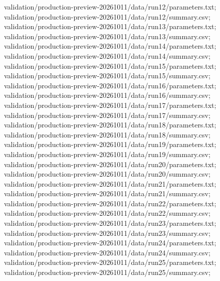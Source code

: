 validation/\allowbreak{}production-preview-20261011/\allowbreak{}data/\allowbreak{}run12/\allowbreak{}parameters.txt; validation/\allowbreak{}production-preview-20261011/\allowbreak{}data/\allowbreak{}run12/\allowbreak{}summary.csv; validation/\allowbreak{}production-preview-20261011/\allowbreak{}data/\allowbreak{}run13/\allowbreak{}parameters.txt; validation/\allowbreak{}production-preview-20261011/\allowbreak{}data/\allowbreak{}run13/\allowbreak{}summary.csv; validation/\allowbreak{}production-preview-20261011/\allowbreak{}data/\allowbreak{}run14/\allowbreak{}parameters.txt; validation/\allowbreak{}production-preview-20261011/\allowbreak{}data/\allowbreak{}run14/\allowbreak{}summary.csv; validation/\allowbreak{}production-preview-20261011/\allowbreak{}data/\allowbreak{}run15/\allowbreak{}parameters.txt; validation/\allowbreak{}production-preview-20261011/\allowbreak{}data/\allowbreak{}run15/\allowbreak{}summary.csv; validation/\allowbreak{}production-preview-20261011/\allowbreak{}data/\allowbreak{}run16/\allowbreak{}parameters.txt; validation/\allowbreak{}production-preview-20261011/\allowbreak{}data/\allowbreak{}run16/\allowbreak{}summary.csv; validation/\allowbreak{}production-preview-20261011/\allowbreak{}data/\allowbreak{}run17/\allowbreak{}parameters.txt; validation/\allowbreak{}production-preview-20261011/\allowbreak{}data/\allowbreak{}run17/\allowbreak{}summary.csv; validation/\allowbreak{}production-preview-20261011/\allowbreak{}data/\allowbreak{}run18/\allowbreak{}parameters.txt; validation/\allowbreak{}production-preview-20261011/\allowbreak{}data/\allowbreak{}run18/\allowbreak{}summary.csv; validation/\allowbreak{}production-preview-20261011/\allowbreak{}data/\allowbreak{}run19/\allowbreak{}parameters.txt; validation/\allowbreak{}production-preview-20261011/\allowbreak{}data/\allowbreak{}run19/\allowbreak{}summary.csv; validation/\allowbreak{}production-preview-20261011/\allowbreak{}data/\allowbreak{}run20/\allowbreak{}parameters.txt; validation/\allowbreak{}production-preview-20261011/\allowbreak{}data/\allowbreak{}run20/\allowbreak{}summary.csv; validation/\allowbreak{}production-preview-20261011/\allowbreak{}data/\allowbreak{}run21/\allowbreak{}parameters.txt; validation/\allowbreak{}production-preview-20261011/\allowbreak{}data/\allowbreak{}run21/\allowbreak{}summary.csv; validation/\allowbreak{}production-preview-20261011/\allowbreak{}data/\allowbreak{}run22/\allowbreak{}parameters.txt; validation/\allowbreak{}production-preview-20261011/\allowbreak{}data/\allowbreak{}run22/\allowbreak{}summary.csv; validation/\allowbreak{}production-preview-20261011/\allowbreak{}data/\allowbreak{}run23/\allowbreak{}parameters.txt; validation/\allowbreak{}production-preview-20261011/\allowbreak{}data/\allowbreak{}run23/\allowbreak{}summary.csv; validation/\allowbreak{}production-preview-20261011/\allowbreak{}data/\allowbreak{}run24/\allowbreak{}parameters.txt; validation/\allowbreak{}production-preview-20261011/\allowbreak{}data/\allowbreak{}run24/\allowbreak{}summary.csv; validation/\allowbreak{}production-preview-20261011/\allowbreak{}data/\allowbreak{}run25/\allowbreak{}parameters.txt; validation/\allowbreak{}production-preview-20261011/\allowbreak{}data/\allowbreak{}run25/\allowbreak{}summary.csv; 